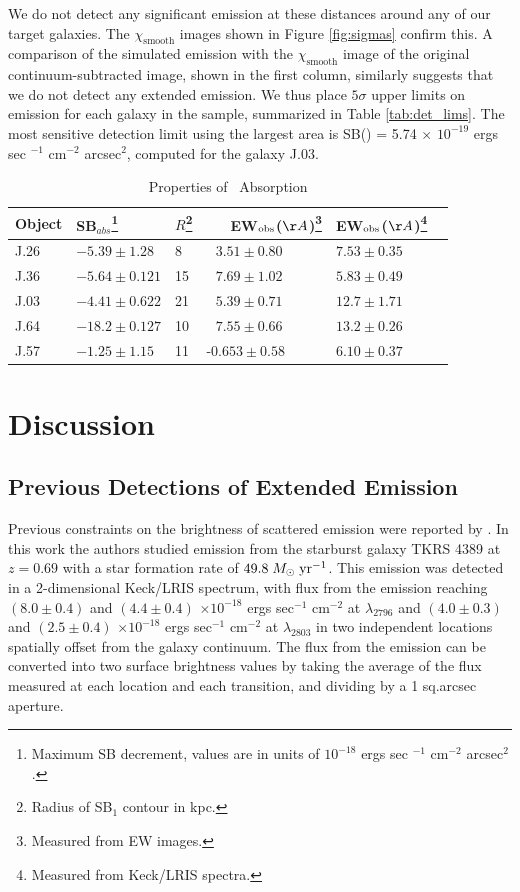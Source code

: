 \documentclass[twocolumn]{aastex61}
\def \msunperyr {{\; M_{\odot}\rm \;yr^{-1}}}
\begin{document}
We do not detect any significant  emission at these distances around any of our target galaxies. The $\chi_{\text{smooth}}$ images shown in Figure \ref{fig:sigmas} confirm this. A comparison of the simulated emission with the $\chi_{\text{smooth}}$ image of the original continuum-subtracted image, shown in the first column, similarly suggests that we do not detect any extended  emission. We thus place $5\sigma$ upper limits on  emission for each galaxy in the sample, summarized in Table \ref{tab:det_lims}. The most sensitive detection limit using the largest area is SB() = 5.74 $\times$ $10^{-19}$ ergs sec $^{-1}$ cm$^{-2}$ arcsec$^2$, computed for the galaxy J.03. 
\begin{table}[]
\centering
\caption{Properties of \ Absorption\label{tab:abs_props}}  
\begin{tabular}{llllll} \hline \hline
Object & SB$_{abs}$\footnote{ Maximum SB decrement, values are in units of $10^{-18}$ ergs sec $^{-1}$ cm$^{-2}$ arcsec$^2$.} & $R$\footnote{ Radius of SB$_1$ contour in kpc.} &\ \ \ EW$_{\rm{obs}}$($\AA$)\footnote{ Measured from EW images.} & EW$_{\rm{obs}}$($\AA$)\footnote{ Measured from Keck/LRIS spectra.}  \\  \hline
J.26 &  $-5.39 \pm 1.28 $ & 8 &     $\ \ \ 3.51 \pm 0.80$ & $7.53 \pm 0.35 $\\
J.36 &  $-5.64 \pm 0.121 $ & 15 & $\ \ \ 7.69 \pm 1.02$ & $5.83 \pm 0.49$\\
J.03 &  $-4.41 \pm 0.622 $ & 21 & $\ \ \ 5.39 \pm 0.71$ & $12.7 \pm 1.71$\\
J.64 &  $-18.2 \pm 0.127 $ & 10 & $\ \ \ 7.55 \pm 0.66$ & $13.2 \pm 0.26$\\
J.57 &  $-1.25 \pm 1.15   $ & 11& -$0.653 \pm 0.58$ & $6.10 \pm 0.37$\\ \hline
\end{tabular}
\end{table}


\section{Discussion}\label{sec:discussion}
\subsection{Previous Detections of Extended  Emission}
Previous constraints on the brightness of scattered  emission were reported by \cite{Rubin_2011}. In this work the authors studied emission from the starburst galaxy TKRS 4389 at $z = 0.69$ with a star formation rate of $49.8\msunperyr$. This emission was detected in a 2-dimensional Keck/LRIS spectrum, with flux from the emission reaching $(8.0 \pm 0.4)$ and $(4.4 \pm 0.4)$ $\times10^{-18}$ ergs sec$^{-1}$ cm$^{-2}$ at  $\lambda _{2796}$ and $(4.0 \pm 0.3)$ and $(2.5 \pm 0.4)$ $\times10^{-18}$ ergs sec$^{-1}$ cm$^{-2}$ at $\lambda_{2803}$ in two independent locations spatially offset from the galaxy continuum. The flux from the emission can be converted into two surface brightness values by taking the average of the flux measured at each location and each transition, and dividing by a 1 sq.arcsec aperture. 
\end{document}
